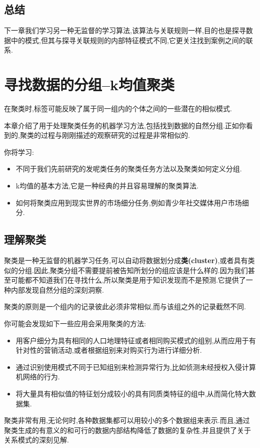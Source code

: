 \documentclass[11pt,a4paper,oneside]{book}
\begin{document}
\section{总结}
下一章我们学习另一种无监督的学习算法,该算法与关联规则一样,目的也是探寻数据中的模式,但其与探寻关联规则的内部特征模式不同,它更关注找到案例之间的联系.

\chapter{寻找数据的分组--k均值聚类}
在聚类时,标签可能反映了属于同一组内的个体之间的一些潜在的相似模式.

本章介绍了用于处理聚类任务的机器学习方法,包括找到数据的自然分组.正如你看到的,聚类的过程与刚刚描述的观察研究的过程是非常相似的.

你将学习:
\begin{itemize}
	\item 不同于我们先前研究的发呢类任务的聚类任务方法以及聚类如何定义分组.
	\item k均值的基本方法,它是一种经典的并且容易理解的聚类算法.
	\item 如何将聚类应用到现实世界的市场细分任务,例如青少年社交媒体用户市场细分.
\end{itemize}

\section{理解聚类}
聚类是一种无监督的机器学习任务,可以自动将数据划分成\textbf{类(cluster)},或者具有类似的分组.因此,聚类分组不需要提前被告知所划分的组应该是什么样的.因为我们甚至可能都不知道我们在寻找什么,所以聚类是用于知识发现而不是预测.它提供了一种内部发现自然分组的深刻洞察.

聚类的原则是一个组内的记录彼此必须非常相似,而与该组之外的记录截然不同.

你可能会发现如下一些应用会采用聚类的方法:
\begin{itemize}
	\item 用客户细分为具有相同的人口地理特征或者相同购买模式的组别,从而应用于有针对性的营销活动,或者根据组别来对购买行为进行详细分析.
	\item 通过识别使用模式不同于已知组别来检测异常行为,比如侦测未经授权入侵计算机网络的行为.
	\item 将大量具有相似值的特征划分成较小的具有同质类特征的组中,从而简化特大数据集.
\end{itemize}

聚类非常有用,无论何时,各种数据集都可以用较小的多个数据组来表示.而且,通过聚类生成的有意义的和可行的数据内部结构降低了数据的复杂性,并且提供了关于关系模式的深刻见解.
\end{document}
